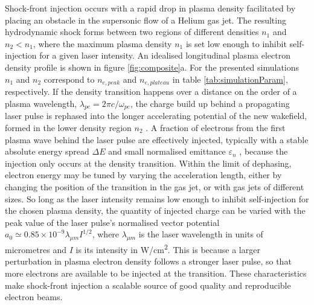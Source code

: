 \documentclass[preprint,5p,times,sort&compress]{elsarticle}
\begin{document}
Shock-front injection \cite{Schmid2010,Buck2013} occurs with a rapid drop in plasma density facilitated by placing an obstacle in the supersonic flow of a Helium gas jet. The resulting hydrodynamic shock forms between two regions of different densities $n_1$ and $n_2<n_1$, where the maximum plasma density $n_1$ is set low enough to inhibit self-injection for a given laser intensity. An idealised longitudinal plasma electron density profile is shown in figure \ref{fig:composite}a. For the presented simulations $n_1$ and $n_2$ correspond to $n_{e,peak}$ and $n_{e,plateau}$ in table \ref{tab:simulationParam}, respectively. If the density transition happens over a distance on the order of a plasma wavelength, $\lambda_{pe} = 2\pi c / \omega_{pe}$, the charge build up behind a propagating laser pulse is rephased into the longer accelerating potential of the new wakefield, formed in the lower density region $n_2$ \cite{Brantov2008}. A fraction of electrons from the first plasma wave behind the laser pulse are effectively injected, typically with a stable absolute energy spread $\Delta E$ and small normalised emittance $\varepsilon_n$ \cite{Buck2013}, because the injection only occurs at the density transition. Within the limit of dephasing, electron energy may be tuned by varying the acceleration length, either by changing the position of the transition in the gas jet, or with gas jets of different sizes. So long as the laser intensity remains low enough to inhibit self-injection for the chosen plasma density, the quantity of injected charge can be varied with the peak value of the laser pulse's normalised vector potential $a_0 \simeq 0.85 \times 10^{-9} \lambda_{\mu m} I^{1/2}$, where $\lambda_{\mu m}$ is the laser wavelength in units of micrometres and $I$ is its intensity in \si{\watt/\centi\metre\squared}. This is because a larger perturbation in plasma electron density follows a stronger laser pulse, so that more electrons are available to be injected at the transition. These characteristics make shock-front injection a scalable source of good quality and reproducible electron beams. 
\end{document}
